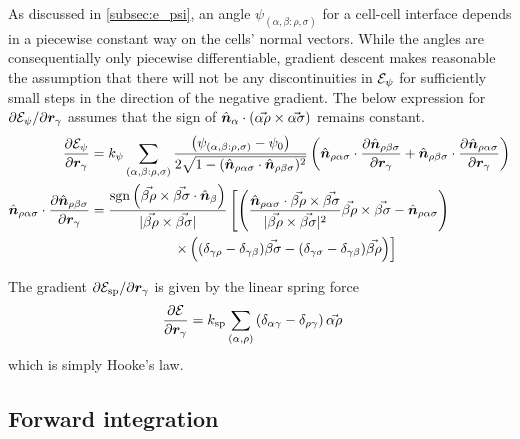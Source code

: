 As discussed in \ref{subsec:e_psi}, an angle $\psi_{(\alpha, \beta: \rho, \sigma)}$ for a cell-cell interface depends in a piecewise constant way on the cells' normal vectors. While the angles are consequentially only piecewise differentiable, gradient descent makes reasonable the assumption that there will not be any discontinuities in $\mathcal{E}_\psi$ for sufficiently small steps in the direction of the negative gradient. The below expression for $\partial \mathcal{E}_\psi / \partial \bm{r}_\gamma$ assumes that the sign of $\hat{\bm{n}}_\alpha \cdot (\vec{\alpha\rho}\times \vec{\alpha\sigma})$ remains constant.
\begin{align}
	\frac{\partial \mathcal{E}_\psi}{\partial \bm{r}_\gamma} &= k_\psi \sum_{(\alpha,\beta: \rho,\sigma)} \frac{\left(\psi_{(\alpha,\beta:\rho,\sigma)} - \psi_0 \right)}{2\sqrt{1 - (\hat{\bm{n}}_{\rho\alpha\sigma}\cdot \hat{\bm{n}}_{\rho\beta\sigma})^2}} \left(\hat{\bm{n}}_{\rho\alpha\sigma} \cdot \frac{\partial \hat{\bm{n}}_{\rho\beta\sigma}}{\partial \bm{r}_\gamma} + \hat{\bm{n}}_{\rho\beta\sigma} \cdot \frac{\partial \hat{\bm{n}}_{\rho\alpha\sigma}}{\partial \bm{r}_\gamma} \right) \nonumber \\
	\hat{\bm{n}}_{\rho\alpha\sigma} \cdot \frac{\partial \hat{\bm{n}}_{\rho\beta\sigma}}{\partial \bm{r}_\gamma} &= \frac{\operatorname{sgn} \left(\vec{\beta\rho} \times \vec{\beta\sigma} \cdot \hat{\bm{n}}_\beta \right)}{|\vec{\beta\rho} \times \vec{\beta\sigma}|} \left[ \left(\frac{\hat{\bm{n}}_{\rho\alpha\sigma} \cdot \vec{\beta\rho}\times\vec{\beta\sigma}}{|\vec{\beta\rho}\times\vec{\beta\sigma}|^2} \vec{\beta\rho}\times\vec{\beta\sigma} - \hat{\bm{n}}_{\rho\alpha\sigma} \right) \right. \nonumber \\
	&\qquad\qquad\qquad \left. \times \left( (\delta_{\gamma\rho} - \delta_{\gamma\beta}) \vec{\beta\sigma} - (\delta_{\gamma\sigma} - \delta_{\gamma\beta}) \vec{\beta\rho} \right) \right] \label{eq:grad_psi}
\end{align}

The gradient $\partial \mathcal{E}_{\text{sp}} / \partial \bm{r}_\gamma$ is given by the linear spring force 
\begin{align}
	\frac{\partial\mathcal{E}}{\partial\bm{r}_\gamma} &= k_{\text{sp}} \sum_{(\alpha,\rho)} \left(\delta_{\alpha\gamma} - \delta_{\rho\gamma} \right)\vec{\alpha\rho} \label{eq:grad_sp}
\end{align}
which is simply Hooke's law.

\subsection{Forward integration}

